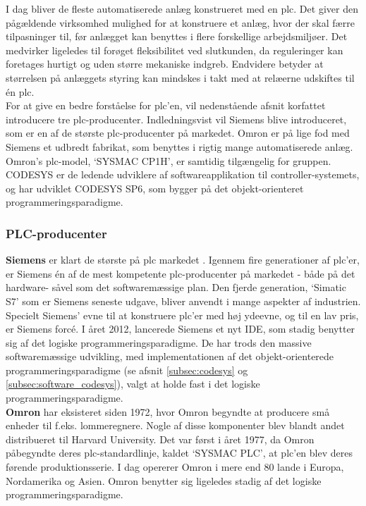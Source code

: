 I dag bliver de fleste automatiserede anlæg konstrueret med en \gls{plc}. Det giver den pågældende virksomhed mulighed for at konstruere et anlæg, hvor der skal færre tilpasninger til, før anlægget kan benyttes i flere forskellige arbejdsmiljøer. Det medvirker ligeledes til forøget fleksibilitet ved slutkunden, da reguleringer kan foretages hurtigt og uden større mekaniske indgreb. Endvidere betyder at størrelsen på anlæggets styring kan mindskes i takt med at relæerne udskiftes til én \gls{plc}.\\

\noindent For at give en bedre forståelse for \gls{plc}'en, vil nedenstående afsnit korfattet introducere tre \gls{plc}-producenter. Indledningsvist vil Siemens blive introduceret, som er en af de største \gls{plc}-producenter på markedet. Omron er på lige fod med Siemens et udbredt fabrikat, som benyttes i rigtig mange automatiserede anlæg. Omron's \gls{plc}-model, \enquote*{SYSMAC CP1H}, er samtidig tilgængelig for gruppen. CODESYS er de ledende udviklere af softwareapplikation til controller-systemets, og har udviklet CODESYS SP6, som bygger på det objekt-orienteret programmeringsparadigme.

\subsubsection*{PLC-producenter}
\label{subsec:siemens}
\noindent\textbf{Siemens} er klart de største på \gls{plc} markedet \cite{plc-marked-shares}. Igennem fire generationer af \gls{plc}'er, er Siemens én af de mest kompetente \gls{plc}-producenter på markedet - både på det hardware- såvel som det softwaremæssige plan. Den fjerde generation, \enquote*{Simatic S7} som er Siemens seneste udgave, bliver anvendt i mange aspekter af industrien. Specielt Siemens' evne til at konstruere \gls{plc}'er med høj ydeevne, og til en lav pris, er Siemens forcé. I året 2012, lancerede Siemens et nyt IDE, som stadig benytter sig af det logiske programmeringsparadigme. De har trods den massive softwaremæssige udvikling, med implementationen af det objekt-orienterede programmeringsparadigme (se afsnit \ref{subsec:codesys} og \ref{subsec:software_codesys}), valgt at holde fast i det logiske programmeringsparadigme. \\

\noindent\textbf{Omron} har eksisteret siden 1972, hvor Omron begyndte at producere små enheder til f.eks. lommeregnere. Nogle af disse komponenter blev blandt andet distribueret til Harvard University. Det var først i året 1977, da Omron påbegyndte deres \gls{plc}-standardlinje, kaldet \enquote*{SYSMAC PLC}, at \gls{plc}'en blev deres førende produktionsserie. I dag opererer Omron i mere end 80 lande i Europa, Nordamerika og Asien\cite{plc-marked-shares}. Omron benytter sig ligeledes stadig af det logiske programmeringsparadigme.\\

